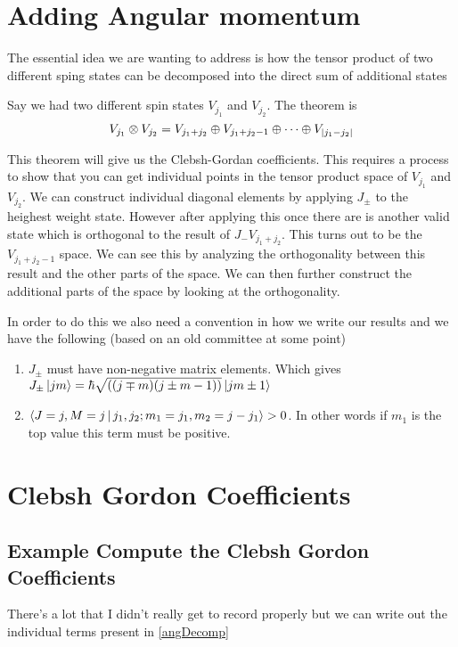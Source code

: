 \section{Adding Angular momentum}
The essential idea we are wanting to address is how the tensor product of two
different sping states can be decomposed into the direct sum of additional states
\begin{theorem}
\label{angDecomp}
Say we had two different spin states $V_{j_1}$ and $V_{j_2}$. The theorem is
$$
V_{j_1} \otimes V_{j_2} =
    V_{j_1 + j_2} \oplus V_{j_1 + j_2 - 1} \oplus \dots \oplus
    V_{\lvert j_1 - j_2\rvert}
$$
\end{theorem}
This theorem will give us the Clebsh-Gordan coefficients. This requires a process to
show that you can get individual points in the tensor product space of $V_{j_1}$ and $V_{j_2}$.
We can construct individual diagonal elements by applying $J_{\pm}$ to the heighest weight
state. However after applying this once there are is another valid state which is orthogonal
to the result of $J_{-} V_{j_1 + j_2}$. This turns out to be the $V_{j_1 + j_2 - 1}$ 
space. We can see this by analyzing the orthogonality between this result and the other
parts of the space. We can then further construct the additional parts of the space by
looking at the orthogonality.

In order to do this we also need a convention in how we write our results and we
have the following (based on an old committee at some point)
\begin{enumerate}
    \item $J_{\pm}$ must have non-negative matrix elements. Which gives \newline
        $J_{\pm} \Ket{j m} = \hbar \sqrt{\left((j\mp m) (j\pm m - 1)\right)}
        \Ket{j m\pm 1}$
    \item $\Braket{J=j, M=j | j_1, j_2; m_1 = j_1, m_2 = j - j_1} > 0$. In other
        words if $m_1$ is the top value this term must be positive.
\end{enumerate}

\section{Clebsh Gordon Coefficients}
\subsection{Example Compute the Clebsh Gordon Coefficients}
There's a lot that I didn't really get to record properly but we can write out the individual
terms present in \ref{angDecomp}

